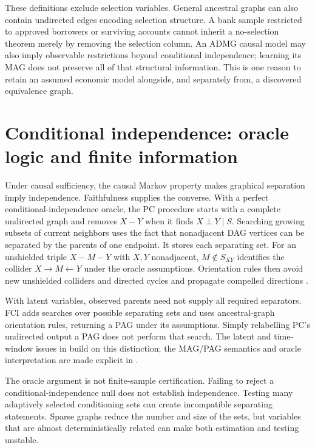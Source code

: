 These definitions exclude selection variables. General ancestral graphs
can also contain undirected edges encoding selection structure. A bank
sample restricted to approved borrowers or surviving accounts cannot
inherit a no-selection theorem merely by removing the selection column.
An ADMG causal model may also imply observable restrictions beyond
conditional independence; learning its MAG does not preserve all of that
structural information. This is one reason to retain an assumed economic
model alongside, and separately from, a discovered equivalence graph.

\section{Conditional independence: oracle logic and finite information}
\label{r3:pc-fci}
Under causal sufficiency, the causal Markov property makes graphical
separation imply independence. Faithfulness supplies the converse.
With a perfect conditional-independence oracle, the PC procedure starts
with a complete undirected graph and removes $X-Y$ when it finds
$X\perp Y\mid S$. Searching growing subsets of current neighbors
uses the fact that nonadjacent DAG vertices can be separated by the
parents of one endpoint. It stores each separating set. For an
unshielded triple $X-M-Y$ with $X,Y$ nonadjacent, $M\notin S_{XY}$
identifies the collider $X\to M\leftarrow Y$ under the oracle
assumptions. Orientation rules then avoid new unshielded colliders
and directed cycles and propagate compelled directions
\citep[Sections 2.2--2.3]{kalisch2007}.

With latent variables, observed parents need not supply all required
separators. FCI adds searches over possible separating sets and uses
ancestral-graph orientation rules, returning a PAG under its assumptions.
Simply relabelling PC's undirected output a PAG does not perform that
search. The latent and time-window issues in
\citet[Section 2]{gerhardus2020} build on this distinction; the MAG/PAG
semantics and oracle interpretation are made explicit in
\citet[Section 3]{zhang2008}.

The oracle argument is not finite-sample certification. Failing to reject
a conditional-independence null does not establish independence. Testing
many adaptively selected conditioning sets can create incompatible
separating statements. Sparse graphs reduce the number and size of the
sets, but variables that are almost deterministically related can make
both estimation and testing unstable.

